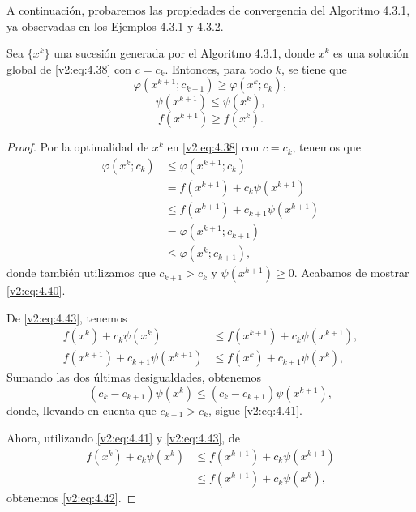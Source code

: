 A continuación, probaremos las propiedades de convergencia del Algoritmo 4.3.1, ya observadas en los Ejemplos 4.3.1 y 4.3.2.

\begin{proposition}\label{v2:prop:4.3.1}
    Sea $\{x^k\}$ una sucesión generada por el Algoritmo 4.3.1, donde $x^k$ es una solución global de \eqref{v2:eq:4.38} con $c = c_k$. Entonces, para todo $k$, se tiene que
    \begin{equation}
        \varphi(x^{k+1}; c_{k+1}) \ge \varphi(x^k; c_k),
        \label{v2:eq:4.40}
    \end{equation}
    \begin{equation}
        \psi(x^{k+1}) \le \psi(x^k),
        \label{v2:eq:4.41}
    \end{equation}
    \begin{equation}
        f(x^{k+1}) \ge f(x^k).
        \label{v2:eq:4.42}
    \end{equation}
\end{proposition}
\begin{proof}
    Por la optimalidad de $x^k$ en \eqref{v2:eq:4.38} con $c = c_k$, tenemos que
    \begin{align}
        \varphi(x^k; c_k) &\le \varphi(x^{k+1}; c_k) \nonumber \\
        &= f(x^{k+1}) + c_k\psi(x^{k+1}) \nonumber \\
        &\le f(x^{k+1}) + c_{k+1}\psi(x^{k+1}) \nonumber \\
        &= \varphi(x^{k+1}; c_{k+1}) \nonumber \\
        &\le \varphi(x^k; c_{k+1}),
        \label{v2:eq:4.43}
    \end{align}
    donde también utilizamos que $c_{k+1} > c_k$ y $\psi(x^{k+1}) \ge 0$. Acabamos de mostrar \eqref{v2:eq:4.40}.

    De \eqref{v2:eq:4.43}, tenemos
    \begin{align*}
        f(x^k) + c_k\psi(x^k) &\le f(x^{k+1}) + c_k\psi(x^{k+1}), \\
        f(x^{k+1}) + c_{k+1}\psi(x^{k+1}) &\le f(x^k) + c_{k+1}\psi(x^k),
    \end{align*}
    Sumando las dos últimas desigualdades, obtenemos
    \[
        (c_k - c_{k+1})\psi(x^k) \le (c_k - c_{k+1})\psi(x^{k+1}),
    \]
    donde, llevando en cuenta que $c_{k+1} > c_k$, sigue \eqref{v2:eq:4.41}.

    Ahora, utilizando \eqref{v2:eq:4.41} y \eqref{v2:eq:4.43}, de
    \begin{align*}
        f(x^k) + c_k\psi(x^k) &\le f(x^{k+1}) + c_k\psi(x^{k+1}) \\
        &\le f(x^{k+1}) + c_k\psi(x^k),
    \end{align*}
    obtenemos \eqref{v2:eq:4.42}.
\end{proof}

